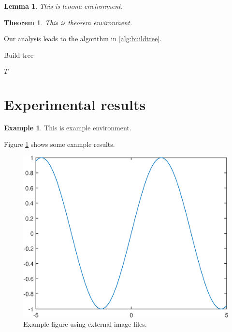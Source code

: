 \documentclass[10pt,reqno,final]{article}
\theoremstyle{plain}
\newtheorem{theorem}{Theorem}[section]
\newtheorem{lemma}{Lemma}[section]
\theoremstyle{definition}
\newtheorem{example}{Example}
\theoremstyle{remark}
\begin{document}
\lipsum[40]

\begin{lemma}
  This is lemma environment.
\end{lemma}


\begin{theorem}
  This is theorem environment.
\end{theorem}


Our analysis leads to the algorithm in \ref{alg:buildtree}.

\begin{algorithm}
\caption{Build tree}
\label{alg:buildtree}
\begin{algorithmic}
\ENDWHILE
\RETURN $T$
\end{algorithmic}
\end{algorithm}

\lipsum[41]

\section{Experimental results}
\label{sec:experiments}

\lipsum[45-46]

\begin{example}
  This is example environment.
\end{example}

Figure \ref{fig:a} shows some example results.

\begin{figure}[htp!]
  \centering
  \includegraphics[width=0.48\linewidth]{fig1}
  \caption{Example figure using external image files.}
  \label{fig:a}
\end{figure}
\end{document}
